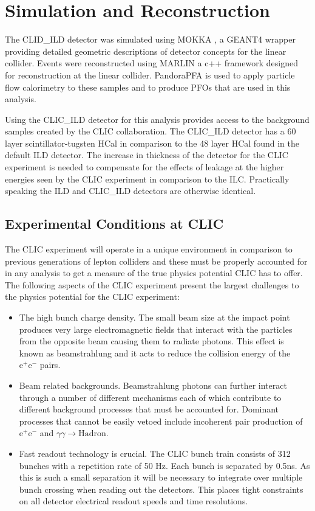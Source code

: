 \section{Simulation and Reconstruction}
The CLID\_ILD detector \cite{arXiv:1006.3396} was simulated using MOKKA \cite{MoradeFreitas:2002kj}, a GEANT4 \cite{Agostinelli:2002hh} wrapper providing detailed geometric descriptions of detector concepts for the linear collider.  Events were reconstructed using MARLIN \cite{Gaede:2006pj} a c++ framework designed for reconstruction at the linear collider.  PandoraPFA \cite{arXiv:0907.3577, arXiv:1209.4039} is used to apply particle flow calorimetry to these samples and to produce PFOs that are used in this analysis.  
 
Using the CLIC\_ILD detector for this analysis provides access to the background samples created by the CLIC collaboration. The CLIC\_ILD detector has a 60 layer scintillator-tugsten HCal in comparison to the 48 layer HCal found in the default ILD detector. The increase in thickness of the detector for the CLIC experiment is needed to compensate for the effects of leakage at the higher energies seen by the CLIC experiment in comparison to the ILC. Practically speaking the ILD and CLIC\_ILD detectors are otherwise identical.

\subsection{Experimental Conditions at CLIC}
The CLIC experiment will operate in a unique environment in comparison to previous generations of lepton colliders and these must be properly accounted for in any analysis to get a measure of the true physics potential CLIC has to offer.  The following aspects of the CLIC experiment present the largest challenges to the physics potential for the CLIC experiment:

\begin{itemize}
\item The high bunch charge density.  The small beam size at the impact point produces very large electromagnetic fields that interact with the particles from the opposite beam causing them to radiate photons.  This effect is known as beamstrahlung and it acts to reduce the collision energy of the $\text{e}^{+}\text{e}^{-}$ pairs.   
\item Beam related backgrounds.  Beamstrahlung photons can further interact through a number of different mechanisms each of which contribute to different background processes that must be accounted for.  Dominant processes that cannot be easily vetoed include incoherent pair production of $\text{e}^{+}\text{e}^{-}$ and $\gamma\gamma \rightarrow \text{Hadron}$.  
\item Fast readout technology is crucial.  The CLIC bunch train consists of 312 bunches with a repetition rate of 50 Hz.  Each bunch is separated by 0.5ns.  As this is such a small separation it will be necessary to integrate over multiple bunch crossing when reading out the detectors.  This places tight constraints on all detector electrical readout speeds and time resolutions.   
\end{itemize}

